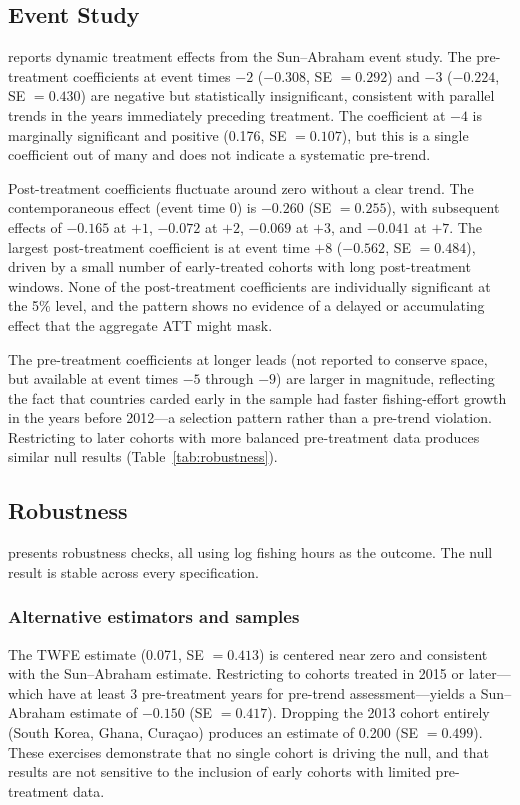 \documentclass[12pt]{article}
\begin{document}


\subsection{Event Study}

 reports dynamic treatment effects from the Sun--Abraham event study. The pre-treatment coefficients at event times $-2$ ($-0.308$, SE $= 0.292$) and $-3$ ($-0.224$, SE $= 0.430$) are negative but statistically insignificant, consistent with parallel trends in the years immediately preceding treatment. The coefficient at $-4$ is marginally significant and positive (0.176, SE $= 0.107$), but this is a single coefficient out of many and does not indicate a systematic pre-trend.

Post-treatment coefficients fluctuate around zero without a clear trend. The contemporaneous effect (event time 0) is $-0.260$ (SE $= 0.255$), with subsequent effects of $-0.165$ at $+1$, $-0.072$ at $+2$, $-0.069$ at $+3$, and $-0.041$ at $+7$. The largest post-treatment coefficient is at event time $+8$ ($-0.562$, SE $= 0.484$), driven by a small number of early-treated cohorts with long post-treatment windows. None of the post-treatment coefficients are individually significant at the 5\% level, and the pattern shows no evidence of a delayed or accumulating effect that the aggregate ATT might mask.

The pre-treatment coefficients at longer leads (not reported to conserve space, but available at event times $-5$ through $-9$) are larger in magnitude, reflecting the fact that countries carded early in the sample had faster fishing-effort growth in the years before 2012---a selection pattern rather than a pre-trend violation. Restricting to later cohorts with more balanced pre-treatment data produces similar null results (Table~\ref{tab:robustness}).



\subsection{Robustness}

 presents robustness checks, all using log fishing hours as the outcome. The null result is stable across every specification.

\subsubsection*{Alternative estimators and samples} The TWFE estimate (0.071, SE $= 0.413$) is centered near zero and consistent with the Sun--Abraham estimate. Restricting to cohorts treated in 2015 or later---which have at least 3 pre-treatment years for pre-trend assessment---yields a Sun--Abraham estimate of $-0.150$ (SE $= 0.417$). Dropping the 2013 cohort entirely (South Korea, Ghana, Cura\c{c}ao) produces an estimate of 0.200 (SE $= 0.499$). These exercises demonstrate that no single cohort is driving the null, and that results are not sensitive to the inclusion of early cohorts with limited pre-treatment data.
\end{document}
